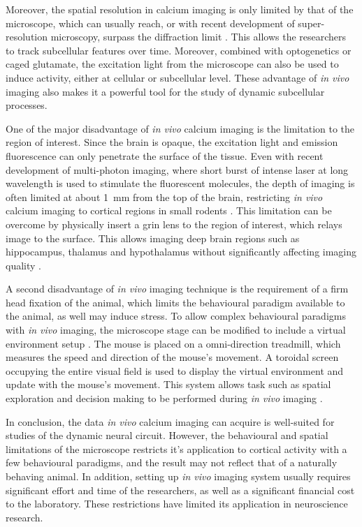 Moreover, the spatial resolution in calcium imaging is only limited by that of the microscope, which can usually reach, or with recent development of super-resolution microscopy, surpass the diffraction limit \citep{dudok15}. This allows the researchers to track subcellular features over time. Moreover, combined with optogenetics or caged glutamate, the excitation light from the microscope can also be used to induce activity, either at cellular or subcellular level\citep{kantevari10, noguchi11, prakash12}. These advantage of \textit{in vivo} imaging also makes it a powerful tool for the study of dynamic subcellular processes. 

One of the major disadvantage of \textit{in vivo} calcium imaging is the limitation to the region of interest. Since the brain is opaque, the excitation light and emission fluorescence can only penetrate the surface of the tissue. Even with recent development of multi-photon imaging, where short burst of intense laser at long wavelength is used to stimulate the fluorescent molecules, the depth of imaging is often limited at about \SI{1}{\mm} from the top of the brain, restricting \textit{in vivo} calcium imaging to cortical regions in small rodents \citep{horton13, yang17}. This limitation can be overcome by physically insert a \gls{grin} lens to the region of interest, which relays image to the surface. This allows imaging deep brain regions such as hippocampus, thalamus and hypothalamus without significantly affecting imaging quality \citep{attardo15}.

A second disadvantage of \textit{in vivo} imaging technique is the requirement of a firm head fixation of the animal, which limits the behavioural paradigm available to the animal, as well may induce stress. To allow complex behavioural paradigms with \textit{in vivo} imaging, the microscope stage can be modified to include a virtual environment setup \citep{harvey09}. The mouse is placed on a omni-direction treadmill, which measures the speed and direction of the mouse's movement. A toroidal screen occupying the entire visual field is used to display the virtual environment and update with the mouse's movement. This system allows task such as spatial exploration and decision making to be performed during \textit{in vivo} imaging \citep{harvey09, harvey12}. 

In conclusion, the data \textit{in vivo} calcium imaging can acquire is well-suited for studies of the dynamic neural circuit. However, the behavioural and spatial limitations of the microscope restricts it's application to cortical activity with a few behavioural paradigms, and the result may not reflect that of a naturally behaving animal. In addition, setting up \textit{in vivo} imaging system usually requires significant effort and time of the researchers, as well as a significant financial cost to the laboratory. These restrictions have limited its application in neuroscience research. 

